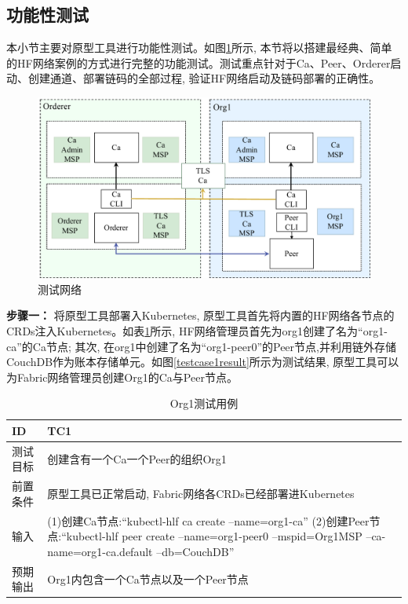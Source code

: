 \subsection{功能性测试}\label{section:functional_test}

本小节主要对原型工具进行功能性测试。如图\ref{fabric_net}所示, 本节将以搭建最经典、简单的HF网络案例的方式进行完整的功能测试。测试重点针对于Ca、Peer、Orderer启动、创建通道、部署链码的全部过程, 验证HF网络启动及链码部署的正确性。

\begin{figure}[h] %
    \centering %
    \includegraphics[width=1.0\textwidth]{FIGs/chapter5/fabric_net.pdf} %
    \caption{测试网络} %
    \label{fabric_net} %
\end{figure}%


\textbf{步骤一：} 将原型工具部署入Kubernetes, 原型工具首先将内置的HF网络各节点的CRDs注入Kubernetes。如表\ref{org1_test}所示, HF网络管理员首先为org1创建了名为“org1-ca”的Ca节点; 其次, 在org1中创建了名为“org1-peer0”的Peer节点,并利用链外存储CouchDB作为账本存储单元。如图\ref{testcase1result}所示为测试结果, 原型工具可以为Fabric网络管理员创建Org1的Ca与Peer节点。

{\footnotesize
\begin{longtable}[h]{m{60pt}|m{280pt}}
    \caption[创建Org1测试用例]{Org1测试用例} \label{org1_test}\\
        \hline  
        ID&TC1\\
        \hline
        测试目标&创建含有一个Ca一个Peer的组织Org1\\
        \hline
        前置条件&原型工具已正常启动, Fabric网络各CRDs已经部署进Kubernetes\\
        \hline
        输入& (1)创建Ca节点:“kubectl-hlf ca create --name=org1-ca”
        \newline (2)创建Peer节点:“kubectl-hlf peer create --name=org1-peer0 --mspid=Org1MSP --ca-name=org1-ca.default --db=CouchDB”\\

        \hline 
        预期输出& Org1内包含一个Ca节点以及一个Peer节点\\
        \hline
    \end{longtable} 
}


